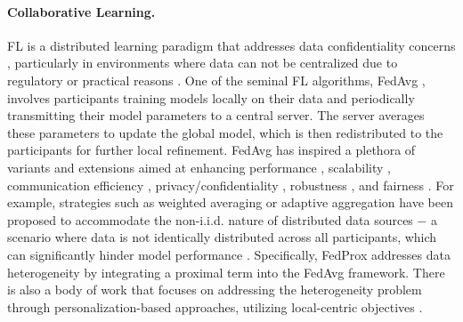 \documentclass{article}
\begin{document}
\paragraph{Collaborative Learning.} FL is a distributed learning paradigm that addresses data confidentiality concerns \citep{kairouz2021advances}, particularly in environments where data can not be centralized due to regulatory or practical reasons \citep{albrecht2016gdpr}. One of the seminal FL algorithms, FedAvg \citep{mcmahan2017communication}, involves participants training models locally on their data and periodically transmitting their model parameters to a central server. The server averages these parameters to update the global model, which is then redistributed to the participants for further local refinement. FedAvg has inspired a plethora of variants and extensions aimed at enhancing performance \citep{karimireddy2020scaffold, li2020federated, mishchenko2022proxskip}, scalability \citep{guo2023federated, al-shedivat2021federated}, communication efficiency \citep{ullah2023private, rahimi2023evofed, isik2022sparse}, privacy/confidentiality \citep{tastan2023capride, choquette2021capc, ullah2023private}, robustness \citep{li2019rsa}, and fairness \citep{xu2021gradient, jiang2023fair, tastan2024redefining}. For example, strategies such as weighted averaging or adaptive aggregation have been proposed to accommodate the non-i.i.d. nature of distributed data sources $-$ a scenario where data is not identically distributed across all participants, which can significantly hinder model performance \citep{li2020federated, wang2020tackling, karimireddy2020scaffold, li2021fedbn, wang2020federated, chezhegov2024local}. Specifically, FedProx \citep{li2020federated} addresses data heterogeneity by integrating a proximal term into the FedAvg framework. There is also a body of work that focuses on addressing the heterogeneity problem through personalization-based approaches, utilizing local-centric objectives \citep{gasanov22flix, hanzely2023personalized, yoon2021fedweit,sadiev2022decentralized,borodich2021decentralized, li2021ditto}. 
\end{document}
